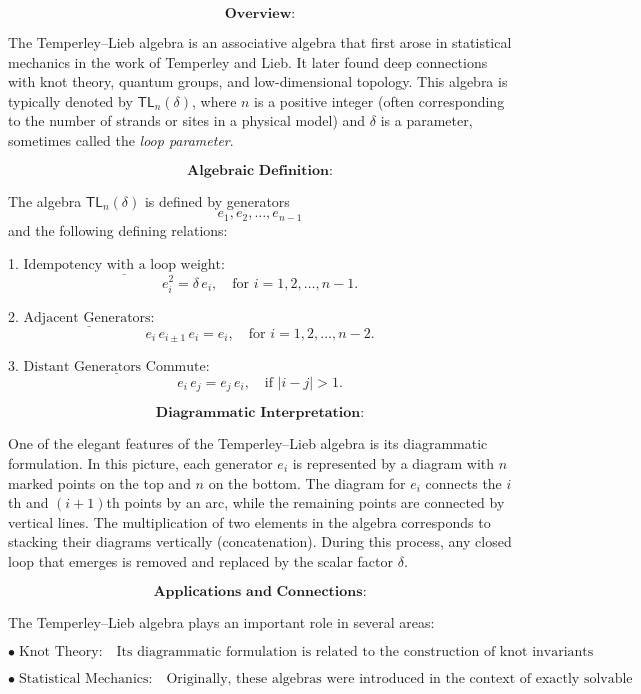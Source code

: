 \documentclass[12p]{article}
\newcounter{answercounter}
\newenvironment{answer}[1][]
{\refstepcounter{answercounter}%
\begin{tcolorbox}[
    title=Answer \theanswercounter: #1,
    colback=white, %
    colframe=gray,
    coltext=black, %
    fonttitle=\bfseries\normalsize,
    top=2mm,
    bottom=2mm,
    enlarge top initially by=5mm
]
\small
}
{\end{tcolorbox}}
\begin{document}
\begin{answer}
\[
\textbf{Overview:}
\]

The Temperley–Lieb algebra is an associative algebra that first arose in statistical mechanics in the work of Temperley and Lieb. It later found deep connections with knot theory, quantum groups, and low-dimensional topology. This algebra is typically denoted by \(\mathsf{TL}_n(\delta)\), where \(n\) is a positive integer (often corresponding to the number of strands or sites in a physical model) and \(\delta\) is a parameter, sometimes called the \emph{loop parameter}.

\[
\textbf{Algebraic Definition:}
\]

The algebra \(\mathsf{TL}_n(\delta)\) is defined by generators
\[
e_1, e_2, \ldots, e_{n-1}
\]
and the following defining relations:

1. \(\underline{\text{Idempotency with a loop weight:}}\)
\[
e_i^2 = \delta\, e_i, \quad \text{for } i = 1, 2, \ldots, n-1.
\]

2. \(\underline{\text{Adjacent Generators:}}\)
\[
e_i\, e_{i\pm 1}\, e_i = e_i, \quad \text{for } i = 1, 2, \ldots, n-2.
\]

3. \(\underline{\text{Distant Generators Commute:}}\)
\[
e_i\, e_j = e_j\, e_i, \quad \text{if } |i - j| > 1.
\]

\[
\textbf{Diagrammatic Interpretation:}
\]

One of the elegant features of the Temperley–Lieb algebra is its diagrammatic formulation. In this picture, each generator \(e_i\) is represented by a diagram with \(n\) marked points on the top and \(n\) on the bottom. The diagram for \(e_i\) connects the \(i\)th and \((i+1)\)th points by an arc, while the remaining points are connected by vertical lines. The multiplication of two elements in the algebra corresponds to stacking their diagrams vertically (concatenation). During this process, any closed loop that emerges is removed and replaced by the scalar factor \(\delta\).

\[
\textbf{Applications and Connections:}
\]

The Temperley–Lieb algebra plays an important role in several areas:

\[
\bullet \; \text{Knot Theory:} \quad \text{Its diagrammatic formulation is related to the construction of knot invariants such as the Jones polynomial.}
\]

\[
\bullet \; \text{Statistical Mechanics:} \quad \text{Originally, these algebras were introduced in the context of exactly solvable lattice models.}
\]


\end{answer}
\end{document}
